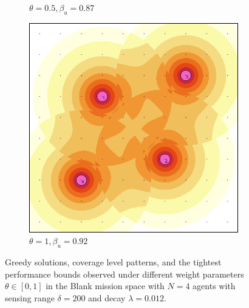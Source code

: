 \documentclass[letterpaper, 10 pt, conference]{ieeeconf}
\begin{document}
\begin{figure}[!h]
\begin{subfigure}[t]{0.32\columnwidth}
        \caption{$\theta = 0.5,\beta_u=0.87$}
    \end{subfigure}%
    \hfill
    \begin{subfigure}[t]{0.32\columnwidth}
        \centering
        \includegraphics[width=\columnwidth]{Figures/DetFun_100.png}
        \caption{$\theta = 1, \beta_u=0.92$}
    \end{subfigure}%
    \caption{Greedy solutions, coverage level patterns, and the tightest performance bounds observed under different weight parameters $\theta \in [0,1]$ in the Blank mission space with $N=4$ agents with sensing range $\delta=200$ and decay $\lambda = 0.012$.}
    \label{Fig:DetectionFunction}
\end{figure}
\end{document}
